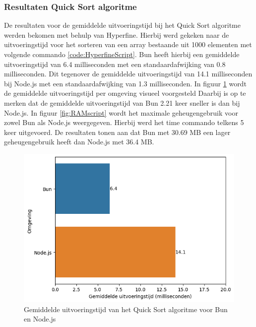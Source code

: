 \subsubsection{Resultaten  Quick Sort algoritme}
De resultaten voor de gemiddelde uitvoeringstijd bij het Quick Sort algoritme werden bekomen met behulp van Hyperfine.
Hierbij werd gekeken naar de uitvoeringstijd voor het sorteren van een array bestaande uit 1000 elementen met volgende commando \ref{code:HyperfineScript}.
Bun heeft hierbij een gemiddelde uitvoeringstijd van 6.4 milliseconden met een standaardafwijking van 0.8 milliseconden. 
Dit tegenover de gemiddelde uitvoeringstijd van 14.1 milliseconden bij Node.js met een standaardafwijking van 1.3 milliseconden.
In figuur \ref{fig:uitvoeringstijdscript} wordt de gemiddelde uitvoeringstijd per omgeving visueel voorgesteld
Daarbij is op te merken dat de gemiddelde uitvoeringstijd van Bun 2.21 keer sneller is dan bij Node.js.
In figuur \ref{fig:RAMscript} wordt het maximale geheugengebruik voor zowel Bun als Node.js weergegeven. 
Hierbij werd het time commando telkens 5 keer uitgevoerd.
De resultaten tonen aan dat Bun met 30.69 MB een lager geheugengebruik heeft dan Node.js met 36.4 MB.
\begin{figure}[H]
  \centering
  \includegraphics{graphics/scriptuitvoeringstijd.png}
  \caption{\label{fig:uitvoeringstijdscript}Gemiddelde uitvoeringstijd van het Quick Sort algoritme voor Bun en Node.js}
\end{figure}

